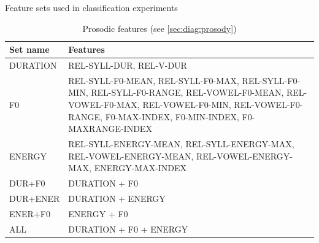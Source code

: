 		
		\begin{table}
			\centering
			\caption[Feature sets used in classification experiments]{Feature sets used in classification experiments}
			
			\vspace{1em}
			
			\begin{subtable}[h]{\textwidth}
				\centering
				\caption{Prosodic features (see \cref{sec:diag:prosody})}
				\begin{tabularx}{.9\textwidth}{lX}
				\toprule
				Set name & Features \\
				\midrule
				DURATION & 	REL-SYLL-DUR, REL-V-DUR \\
				\addlinespace
				F0 &	REL-SYLL-F0-MEAN,\newline
						REL-SYLL-F0-MAX, \newline
						REL-SYLL-F0-MIN, \newline
						REL-SYLL-F0-RANGE, \newline
						REL-VOWEL-F0-MEAN, \newline
						REL-VOWEL-F0-MAX, \newline
						REL-VOWEL-F0-MIN, \newline
						REL-VOWEL-F0-RANGE, \newline
						F0-MAX-INDEX, \newline
						F0-MIN-INDEX, \newline
						F0-MAXRANGE-INDEX \\
				\addlinespace
				ENERGY &	REL-SYLL-ENERGY-MEAN, \newline
								REL-SYLL-ENERGY-MAX, \newline
								REL-VOWEL-ENERGY-MEAN, \newline
								REL-VOWEL-ENERGY-MAX, \newline
								ENERGY-MAX-INDEX \\
				\addlinespace
				DUR+F0 & DURATION + F0 \\
				DUR+ENER & DURATION + ENERGY \\
				ENER+F0 & ENERGY + F0 \\
				ALL & DURATION + F0 + ENERGY \\
				\bottomrule
				\end{tabularx}
				\label{tab:features:sets:prosody}
			\end{subtable}
			
			\vspace{2em}			
			

\end{table}
